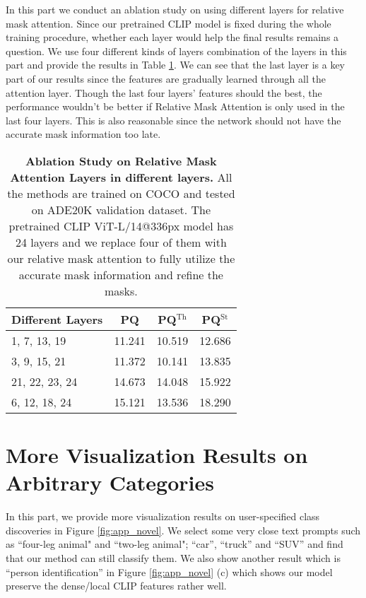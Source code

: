 \documentclass{article}
\theoremstyle{plain}
\theoremstyle{definition}
\theoremstyle{remark}
\begin{document}
In this part we conduct an ablation study on using different layers for relative mask attention. Since our pretrained CLIP model is fixed during the whole training procedure, whether each layer would help the final results remains a question. We use four different kinds of layers combination of the layers in this part and provide the results in Table \ref{tab:ablation_rma}. We can see that the last layer is a key part of our results since the features are gradually learned through all the attention layer. Though the last four layers' features should the best, the performance wouldn't be better if Relative Mask Attention is only used in the last four layers. This is also reasonable since the network should not have the accurate mask information too late.

\begin{table}[!htbp]
\begin{center}
\caption{\textbf{Ablation Study on Relative Mask Attention Layers in different layers.} All the methods are trained on COCO and tested on ADE20K validation dataset. The pretrained CLIP ViT-L/14@336px model has 24 layers and we replace four of them with our relative mask attention to fully utilize the accurate mask information and refine the masks. }

\label{tab:ablation_rma}
\begin{tabular}{l | c | c | c}
 Different Layers & PQ & PQ$^{\text{Th}}$ & PQ$^{\text{St}}$\\
\hline
1, 7, 13, 19 & 11.241 & 10.519  & 12.686 \\
3, 9, 15, 21 & 11.372 & 10.141 & 13.835 \\
21, 22, 23, 24 & 14.673 & 14.048 & 15.922 \\
6, 12, 18, 24 & 15.121 & 13.536 & 18.290
\end{tabular}
\end{center}
\end{table}

\section{More Visualization Results on Arbitrary Categories}

In this part, we provide more visualization results on user-specified class discoveries in Figure \ref{fig:app_novel}. We select some very close text prompts such as ``four-leg animal" and ``two-leg animal"; ``car'', ``truck'' and ``SUV'' and find that our method can still classify them. We also show another result which is ``person identification'' in Figure \ref{fig:app_novel} (c) which shows our model preserve the dense/local CLIP features rather well.
\end{document}
